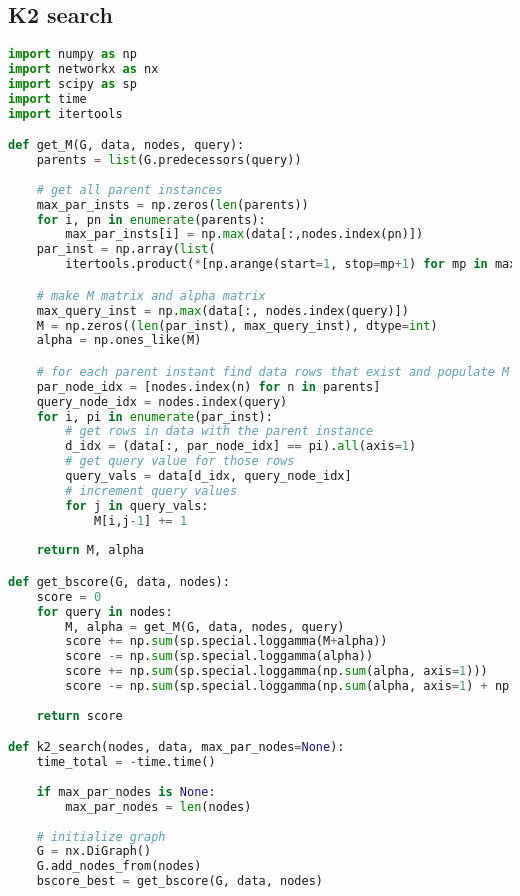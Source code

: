 \documentclass[twoside,11pt]{article}
\begin{document}
\subsection{K2 search}
\begin{algorithm}
\begin{lstlisting}[language=Python]
import numpy as np
import networkx as nx
import scipy as sp
import time
import itertools

def get_M(G, data, nodes, query):
    parents = list(G.predecessors(query))
    
    # get all parent instances
    max_par_insts = np.zeros(len(parents)) 
    for i, pn in enumerate(parents):
        max_par_insts[i] = np.max(data[:,nodes.index(pn)])
    par_inst = np.array(list(
        itertools.product(*[np.arange(start=1, stop=mp+1) for mp in max_par_insts])), dtype=int)

    # make M matrix and alpha matrix
    max_query_inst = np.max(data[:, nodes.index(query)])
    M = np.zeros((len(par_inst), max_query_inst), dtype=int)
    alpha = np.ones_like(M)

    # for each parent instant find data rows that exist and populate M
    par_node_idx = [nodes.index(n) for n in parents]
    query_node_idx = nodes.index(query)
    for i, pi in enumerate(par_inst):
        # get rows in data with the parent instance
        d_idx = (data[:, par_node_idx] == pi).all(axis=1)
        # get query value for those rows
        query_vals = data[d_idx, query_node_idx]
        # increment query values
        for j in query_vals:
            M[i,j-1] += 1  
    
    return M, alpha

def get_bscore(G, data, nodes):
    score = 0
    for query in nodes:
        M, alpha = get_M(G, data, nodes, query)
        score += np.sum(sp.special.loggamma(M+alpha))
        score -= np.sum(sp.special.loggamma(alpha))
        score += np.sum(sp.special.loggamma(np.sum(alpha, axis=1)))
        score -= np.sum(sp.special.loggamma(np.sum(alpha, axis=1) + np.sum(M, axis=1)))
    
    return score

def k2_search(nodes, data, max_par_nodes=None):
    time_total = -time.time()
    
    if max_par_nodes is None:
        max_par_nodes = len(nodes)
        
    # initialize graph
    G = nx.DiGraph()
    G.add_nodes_from(nodes)
    bscore_best = get_bscore(G, data, nodes)
    

\end{lstlisting}
\end{algorithm}
\end{document}
